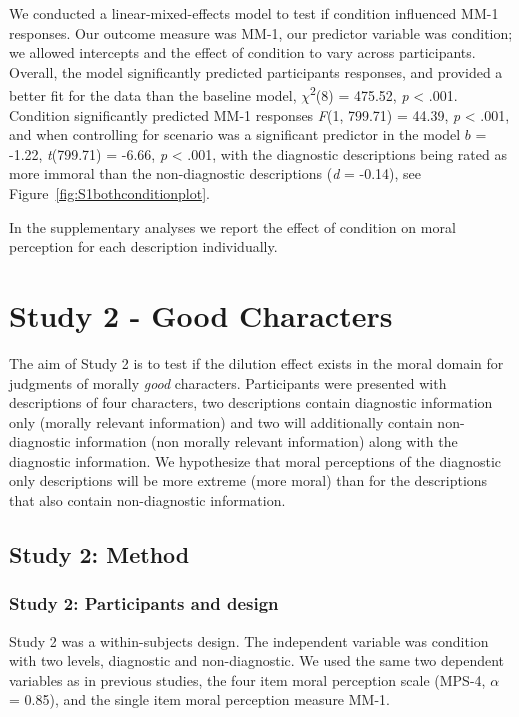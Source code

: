 \documentclass[
  man,floatsintext]{apa7}
\begin{document}
We conducted a linear-mixed-effects model to test if condition influenced MM-1 responses. Our outcome measure was MM-1, our predictor variable was condition; we allowed intercepts and the effect of condition to vary across participants. Overall, the model significantly predicted participants responses, and provided a better fit for the data than the baseline model, \(\chi\)\textsuperscript{2}(8) = 475.52, \emph{p} \textless{} .001. Condition significantly predicted MM-1 responses \emph{F}(1, 799.71) = 44.39, \emph{p} \textless{} .001, and when controlling for scenario was a significant predictor in the model \(b\) = -1.22, \emph{t}(799.71) = -6.66, \emph{p} \textless{} .001, with the diagnostic descriptions being rated as more immoral than the non-diagnostic descriptions (\emph{d} = -0.14), see Figure~\ref{fig:S1bothconditionplot}.

In the supplementary analyses we report the effect of condition on moral perception for each description individually.

\section{Study 2 - Good Characters}\label{study-2---good-characters}

The aim of Study 2 is to test if the dilution effect exists in the moral domain for judgments of morally \emph{good} characters. Participants were presented with descriptions of four characters, two descriptions contain diagnostic information only (morally relevant information) and two will additionally contain non-diagnostic information (non morally relevant information) along with the diagnostic information. We hypothesize that moral perceptions of the diagnostic only descriptions will be more extreme (more moral) than for the descriptions that also contain non-diagnostic information.

\subsection{Study 2: Method}\label{study-2-method}

\subsubsection{Study 2: Participants and design}\label{study-2-participants-and-design}

Study 2 was a within-subjects design. The independent variable was condition with two levels, diagnostic and non-diagnostic. We used the same two dependent variables as in previous studies, the four item moral perception scale (MPS-4, \(\alpha\) = 0.85), and the single item moral perception measure MM-1.
\end{document}
